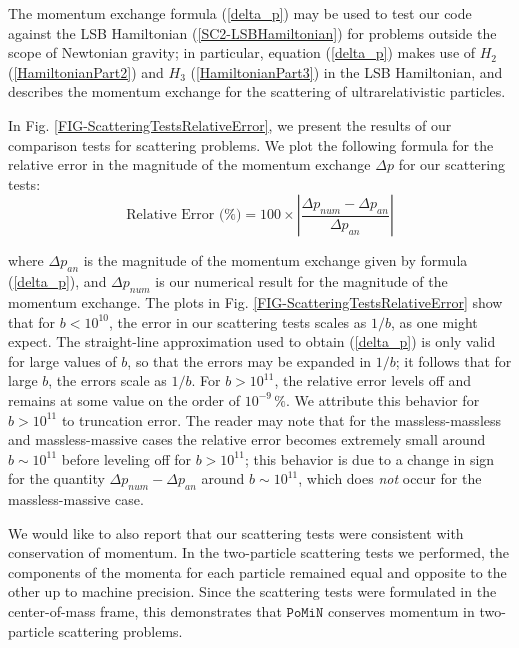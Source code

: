 \documentclass[aps,onecolumn,notitlepage,eqsecnum,nofootinbib,floatfix,superscriptaddress]{revtex4-1}
\newcommand{\codename}{\mathtt{PoMiN}}
\begin{document}
The momentum exchange formula (\ref{delta_p}) may be used to test our code against the LSB Hamiltonian (\ref{SC2-LSBHamiltonian}) for problems outside the scope of Newtonian gravity; in particular, equation (\ref{delta_p}) makes use of $H_2$ (\ref{HamiltonianPart2}) and $H_3$ (\ref{HamiltonianPart3}) in the LSB Hamiltonian, and describes the momentum exchange for the scattering of ultrarelativistic particles.

In Fig. \ref{FIG-ScatteringTestsRelativeError}, we present the results of our comparison tests for scattering problems. We plot the following formula for the relative error in the magnitude of the momentum exchange $\Delta p$ for our scattering tests:
\begin{equation} \label{relerror}
\text{Relative Error (\%)} = 100 \times \left| \frac{\Delta p_{num} - \Delta p_{an}}{\Delta p_{an}} \right|
\end{equation}

\noindent where $\Delta p_{an}$ is the magnitude of the momentum exchange given by formula (\ref{delta_p}), and $\Delta p_{num}$ is our numerical result for the magnitude of the momentum exchange. The plots in Fig. \ref{FIG-ScatteringTestsRelativeError} show that for $b<10^{10}$, the error in our scattering tests scales as $1/b$, as one might expect. The straight-line approximation used to obtain (\ref{delta_p}) is only valid for large values of $b$, so that the errors may be expanded in $1/b$; it follows that for large $b$, the errors scale as $1/b$. For $b>10^{11}$, the relative error levels off and remains at some value on the order of $10^{-9} \, \%$. We attribute this behavior for $b>10^{11}$ to truncation error. The reader may note that for the massless-massless and massless-massive cases the relative error becomes extremely small around $b \sim 10^{11}$ before leveling off for $b>10^{11}$; this behavior is due to a change in sign for the quantity $\Delta p_{num} - \Delta p_{an}$ around $b \sim 10^{11}$, which does \textit{not} occur for the massless-massive case.

We would like to also report that our scattering tests were consistent with conservation of momentum. In the two-particle scattering tests we performed, the components of the momenta for each particle remained equal and opposite to the other up to machine precision. Since the scattering tests were formulated in the center-of-mass frame, this demonstrates that $\codename$ conserves momentum in two-particle scattering problems.

%
%
\end{document}
